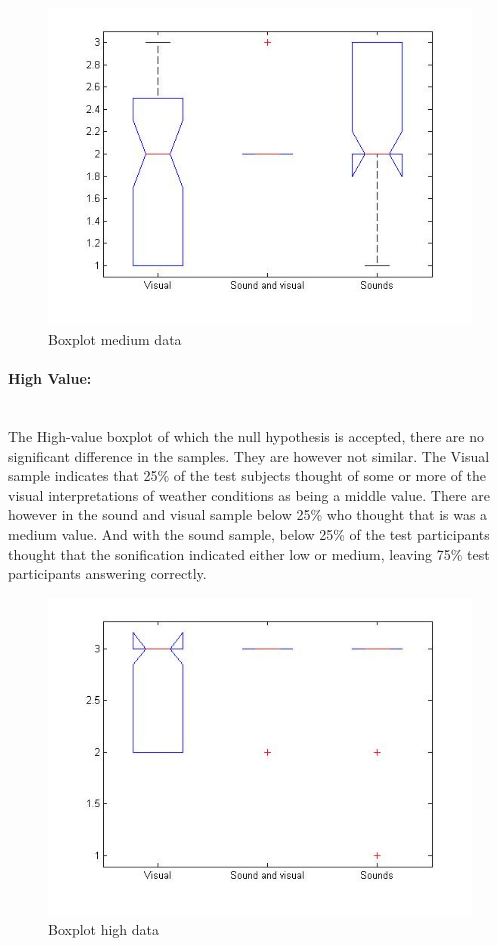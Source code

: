 \begin{figure}[!htbp]
    \centering
    \includegraphics[width=.7\textwidth]{images/Evaluation7.jpg}
    \caption{Boxplot medium data}
    \label{fig:evaluation7_2}
\end{figure}


\paragraph{High Value:} %
\label{par:high_value_}
\hspace{0pt} \\
The High-value boxplot of which the null hypothesis is accepted, there are no significant difference in the samples. 
They are however not similar.
The Visual sample indicates that 25\% of the test subjects thought of some or more of the visual interpretations of weather conditions as being a middle value. 
There are however in the sound and visual sample below 25\% who thought that is was a medium value. 
And with the sound sample, below 25\% of the test participants thought that the sonification indicated either low or medium, leaving 75\% test participants answering correctly.

\begin{figure}[!htbp]
    \centering
    \includegraphics[width=.7\textwidth]{images/Evaluation8.jpg}
    \caption{Boxplot high data}
    \label{fig:evaluation8_2}
\end{figure}


